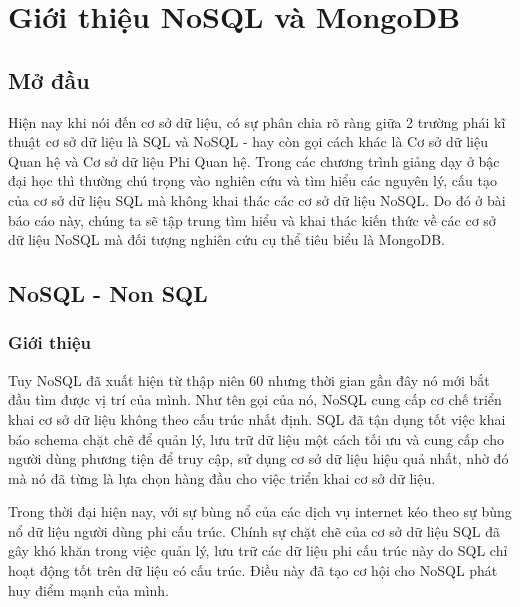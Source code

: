 \chapter{Giới thiệu NoSQL và MongoDB}
\section{Mở đầu}
Hiện nay khi nói đến cơ sở dữ liệu, có sự phân chia rõ ràng giữa 2 trường phái kĩ thuật cơ sở dữ liệu là SQL và NoSQL - hay còn gọi cách khác là Cơ sở dữ liệu Quan hệ và Cơ sở dữ liệu Phi Quan hệ. Trong các chương trình giảng dạy ở bậc đại học thì thường chú trọng vào nghiên cứu và tìm hiểu các nguyên lý, cấu tạo của cơ sở dữ liệu SQL mà không khai thác các cơ sở dữ liệu NoSQL. Do đó ở bài báo cáo này, chúng ta sẽ tập trung tìm hiểu và khai thác kiến thức về các cơ sở dữ liệu NoSQL mà đối tượng nghiên cứu cụ thể tiêu biểu là MongoDB.

\section{NoSQL - Non SQL}
\subsection{Giới thiệu}
Tuy NoSQL đã xuất hiện từ thập niên 60 nhưng thời gian gần đây nó mới bắt đầu tìm được vị trí của mình. Như tên gọi của nó, NoSQL cung cấp cơ chế triển khai cơ sở dữ liệu không theo cấu trúc nhất định. SQL đã tận dụng tốt việc khai báo schema chặt chẽ để quản lý, lưu trữ dữ liệu một cách tối ưu và cung cấp cho người dùng phương tiện để truy cập, sử dụng cơ sở dữ liệu hiệu quả nhất, nhờ đó mà nó đã từng là lựa chọn hàng đầu cho việc triển khai cơ sở dữ liệu.

Trong thời đại hiện nay, với sự bùng nổ của các dịch vụ internet kéo theo sự bùng nổ dữ liệu người dùng phi cấu trúc. Chính sự chặt chẽ của cơ sở dữ liệu SQL đã gây khó khăn trong việc quản lý, lưu trữ các dữ liệu phi cấu trúc này do SQL chỉ hoạt động tốt trên dữ liệu có cấu trúc. Điều này đã tạo cơ hội cho NoSQL phát huy điểm mạnh của mình.
